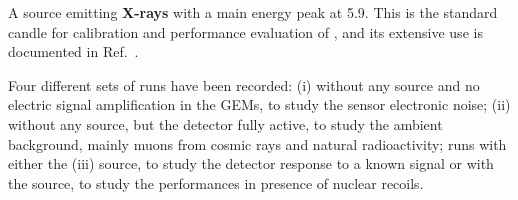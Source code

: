 \documentclass[12pt]{iopart}
\begin{document}
\vspace{10pt}

A \fe source emitting {\bf X-rays} with a main energy peak at 5.9\keV.
This is the standard candle for calibration and performance evaluation
of \lemon, and its extensive use is documented in
Ref.~\cite{bib:fe55}.

\vspace{10pt}

Four different sets of runs have been recorded: (i) without any source
and no electric signal amplification in the GEMs, to study the sensor
electronic noise; (ii) without any source, but the detector fully
active, to study the ambient background, mainly muons from cosmic rays
and natural radioactivity; runs with either the (iii) \fe source, to
study the detector response to a known signal or with the \ambe
source, to study the \lemon performances in presence of nuclear
recoils.


\vspace{10pt}
\end{document}
